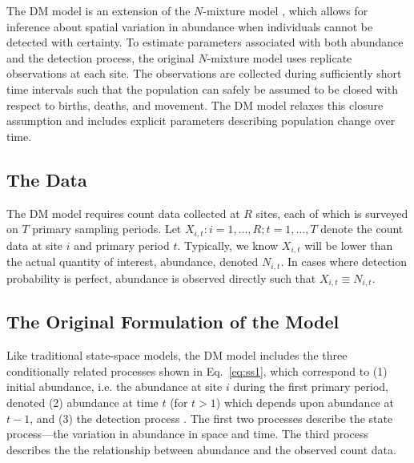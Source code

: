 \documentclass[12pt]{article}
\begin{document}
The DM model is an extension of the $N$-mixture model
\citep{royle:2004biom}, which allows for inference about spatial
variation in abundance when individuals cannot be detected with
certainty. To estimate parameters associated with both abundance 
and the detection process, the original $N$-mixture model uses replicate
observations at each site. The observations are collected during sufficiently
short time intervals such that the population can safely be
assumed to be closed with respect to births, deaths, and movement. The DM
model relaxes this closure assumption and includes explicit parameters
describing population change over time.


\subsection{The Data}

The DM model requires count data collected at $R$ sites, each of
which is surveyed on $T$ primary sampling periods. 
Let $X_{i,t}: i=1,\hdots,R; t=1,\hdots,T$ denote the count data
at site $i$ and primary period $t$. 
Typically, we know $X_{i,t}$ will be lower than the
actual quantity of interest, abundance,
denoted $N_{i,t}$. In cases where detection probability is perfect,
abundance is observed directly such that $X_{i,t} \equiv N_{i,t}$.

\subsection{The Original Formulation of the Model}

Like traditional state-space models, the DM model includes the
three conditionally related processes shown in Eq.~\ref{eq:ss1},
which correspond to (1) initial abundance, i.e. the
abundance at site $i$ during the first primary period,
denoted (2) abundance at time $t$ (for $t>1$) which depends upon
abundance at $t-1$, and (3) the
detection process \citep{dail_madsen:2011}.
The first two processes describe the state process---the
variation in abundance in space and time. The third process %
describes the the relationship between
abundance and the observed count data.
\end{document}
